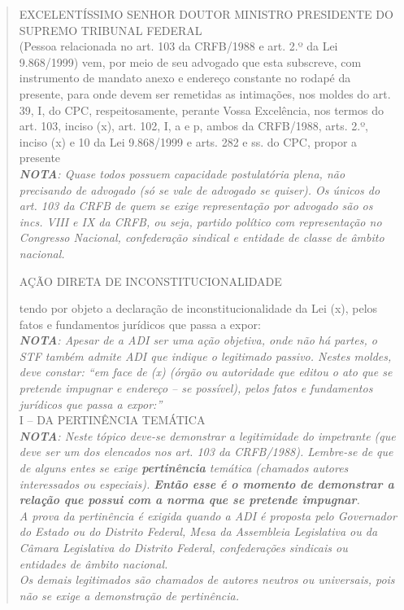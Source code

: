\documentclass{article}
\begin{document}
\begin{quote}
    EXCELENTÍSSIMO SENHOR DOUTOR MINISTRO PRESIDENTE DO SUPREMO TRIBUNAL FEDERAL\\


(Pessoa relacionada no art. 103 da CRFB/1988 e art. 2.º da Lei 9.868/1999) vem, por meio de seu advogado que esta subscreve, com instrumento de mandato anexo e endereço constante no rodapé da presente, para onde devem ser remetidas as intimações, nos moldes do art. 39, I, do CPC, respeitosamente, perante Vossa Excelência, nos termos do art. 103, inciso (x), art. 102, I, a e p, ambos da CRFB/1988, arts. 2.º, inciso (x) e 10 da Lei 9.868/1999 e arts. 282 e ss. do CPC, propor a presente\\

\textit{\textbf{NOTA}: Quase todos possuem capacidade postulatória plena, não precisando de advogado (só se vale de advogado se quiser). Os únicos do art. 103 da CRFB de quem se exige representação por advogado são os incs. VIII e IX da CRFB, ou seja, partido político com representação no Congresso Nacional, confederação sindical e entidade de classe de âmbito nacional.}\\

\begin{center}
    AÇÃO DIRETA DE INCONSTITUCIONALIDADE
\end{center}

tendo por objeto a declaração de inconstitucionalidade da Lei (x), pelos fatos e fundamentos jurídicos que passa a expor:\\

\textit{\textbf{NOTA}: Apesar de a ADI ser uma ação objetiva, onde não há partes, o STF também admite ADI que indique o legitimado passivo. Nestes moldes, deve constar: “em face de (x) (órgão ou autoridade que editou o ato que se pretende impugnar e endereço – se possível), pelos fatos e fundamentos jurídicos que passa a expor:”}\\

I – DA PERTINÊNCIA TEMÁTICA\\

\textit{\textbf{NOTA}: Neste tópico deve-se demonstrar a legitimidade do impetrante (que deve ser um dos elencados nos art. 103 da CRFB/1988). Lembre-se de que de alguns entes se exige \textbf{pertinência} temática (chamados autores interessados ou especiais). \textbf{Então esse é o momento de demonstrar a relação que possui com a norma que se pretende impugnar}.\\
A prova da pertinência é exigida quando a ADI é proposta pelo Governador do Estado ou do Distrito Federal, Mesa da Assembleia Legislativa ou da Câmara Legislativa do Distrito Federal, confederações sindicais ou entidades de âmbito nacional.\\
Os demais legitimados são chamados de autores neutros ou universais, pois não se exige a demonstração de pertinência.}\\


\end{quote}
\end{document}
